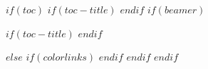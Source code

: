 $if(toc)$
$if(toc-title)$
$endif$
$if(beamer)$
\begin{frame}[allowframebreaks]
$if(toc-title)$
$endif$
\end{frame}
$else$
{
$if(colorlinks)$
\hypersetup{linkcolor=$if(toccolor)$$toccolor$$else$$endif$}
$endif$
}
$endif$
$endif$
